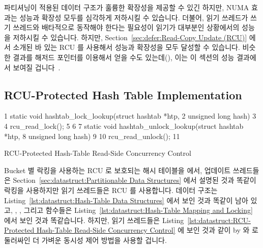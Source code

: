 파티셔닝이 적용된 데이터 구조가 훌륭한 확장성을 제공할 수 있긴 하지만, NUMA
효과는 성능과 확장성 모두를 심각하게 저하시킬 수 있습니다.
더불어, 읽기 쓰레드가 쓰기 쓰레드와 배타적으로 동작해야 한다는 필요성이 읽기가
대부분인 상황에서의 성능을 저하시킬 수 있습니다.
하지만,
Section~\ref{sec:defer:Read-Copy Update (RCU)} 에서 소개된 바 있는 RCU 를
사용해서 성능과 확장성을 모두 달성할 수 있습니다.
비슷한 결과를 해저드 포인터를 이용해서 얻을 수도 있는데(), 이는
이 섹션의 성능 결과에서 보여질 겁니다~\cite{McKenney:2013:SDS:2483852.2483867}.

\subsection{RCU-Protected Hash Table Implementation}
\label{sec:datastruct:RCU-Protected Hash Table Implementation}

\begin{listing}[tb]
{ \scriptsize
\begin{verbbox}
 1 static void hashtab_lock_lookup(struct hashtab *htp,
 2                                 unsigned long hash)
 3 {
 4   rcu_read_lock();
 5 }
 6 
 7 static void hashtab_unlock_lookup(struct hashtab *htp,
 8                                   unsigned long hash)
 9 {
10   rcu_read_unlock();
11 }
\end{verbbox}
}
\centering
\theverbbox
\caption{RCU-Protected Hash-Table Read-Side Concurrency Control}
\label{lst:datastruct:RCU-Protected Hash-Table Read-Side Concurrency Control}
\end{listing}

Bucket 별 락킹을 사용하는 RCU 로 보호되는 해시 테이블을 에서, 업데이트
쓰레드들은
Section~\ref{sec:datastruct:Partitionable Data Structures} 에서 설명된 것과
똑같이 락킹을 사용하지만 읽기 쓰레드들은 RCU 를 사용합니다.
데이터 구조는
Listing~\ref{lst:datastruct:Hash-Table Data Structures} 에서 보인 것과 똑같이
남아 있고,
, , 그리고  함수들은
Listing~\ref{lst:datastruct:Hash-Table Mapping and Locking} 에서 보인 것과
똑같습니다.
하지만, 읽기 쓰레드들은
Listing~\ref{lst:datastruct:RCU-Protected Hash-Table Read-Side Concurrency
Control} 에 보인 것과 같이
by  와  로 둘러싸인 더
가벼운 동시성 제어 방법을 사용할 겁니다.
\iffalse

